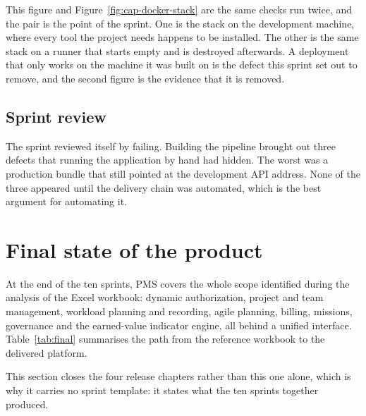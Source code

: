 This figure and Figure~\ref{fig:cap-docker-stack} are the same checks run twice, and the pair
is the point of the sprint. One is the stack on the development machine, where every tool the
project needs happens to be installed. The other is the same stack on a runner that starts empty
and is destroyed afterwards. A deployment that only works on the machine it was built on is the
defect this sprint set out to remove, and the second figure is the evidence that it is removed.

\subsection{Sprint review}
The sprint reviewed itself by failing. Building the pipeline brought out three defects that
running the application by hand had hidden. The worst was a production bundle that still pointed
at the development API address. None of the three appeared until the delivery chain was automated,
which is the best argument for automating it.

\section{Final state of the product}
At the end of the ten sprints, PMS covers the whole scope identified during the analysis of the
Excel workbook: dynamic authorization, project and team management, workload planning and recording,
agile planning, billing, missions, governance and the earned-value indicator engine, all behind a
unified interface. Table~\ref{tab:final} summarises the path from the reference workbook to the
delivered platform.

This section closes the four release chapters rather than this one alone, which is why it
carries no sprint template: it states what the ten sprints together produced.


